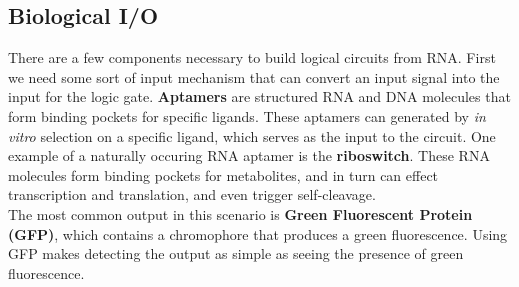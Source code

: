 \documentclass[12pt]{article}
\begin{document}
\subsection{Biological I/O}
There are a few components necessary to build logical circuits from RNA. First we need some sort of input mechanism that can convert an input signal into the input for the logic gate. {\bf Aptamers} are structured RNA and DNA molecules that form binding pockets for specific ligands. These aptamers can generated by {\it in vitro} selection on a specific ligand, which serves as the input to the circuit. One example of a naturally occuring RNA aptamer is the {\bf riboswitch}. These RNA molecules form binding pockets for metabolites, and in turn can effect transcription and translation, and even trigger self-cleavage.\\[10pt]
The most common output in this scenario is {\bf Green Fluorescent Protein (GFP)}, which contains a chromophore that produces a green fluorescence. Using GFP makes detecting the output as simple as seeing the presence of green fluorescence.
\end{document}
